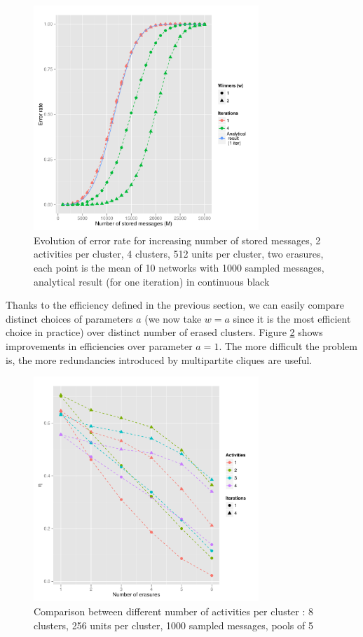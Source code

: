 \documentclass[english,10pt,twocolumn]{IEEEtran}
\theoremstyle{definition}
\begin{document}
		\begin{figure}[!htb]
		\includegraphics[width=8.5cm]{Courbes/fig3c4l512e2a2} %
		\caption{Evolution of error rate for increasing number of stored messages, 2 activities per cluster, 4 clusters, 512 units per cluster, two erasures, each point is the mean of 10 networks with 1000 sampled messages, analytical result (for one iteration) in continuous black}
			\label{erasuresth}
		\end{figure}		
		
		Thanks to the efficiency defined in the previous section, we can easily compare distinct choices of parameters $a$ (we now take $w = a$ since it is the most efficient choice in practice) over distinct number of erased clusters. Figure \ref{comperth} shows improvements in efficiencies over parameter $a =1$. The more difficult the problem is, the more redundancies introduced by multipartite cliques are useful.
		
		\begin{figure}[!htb]
		\includegraphics[width=8.5cm]{Courbes/5portant_erasures_c8l256}
		\caption{Comparison between different number of activities per cluster :  8 clusters, 256 units per cluster, 1000 sampled messages, pools of 5}
		\label{comperth}
	\end{figure}
%	
	
\end{document}
